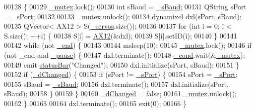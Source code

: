 \begin{DoxyCode}
00128 \{
00129     \hyperlink{a00008_a6327eafc0dac189ec1b202d63ef32457}{\_mutex}.lock();
00130     \textcolor{keywordtype}{int} sBaud = \hyperlink{a00008_a5b9a41b9e271275b914affb0a845a2ee}{\_sBaud};
00131     QString sPort = \hyperlink{a00008_ac9a614aa1518efb49b0a06636bd1bdbf}{\_sPort};
00132     
00133     \hyperlink{a00008_a6327eafc0dac189ec1b202d63ef32457}{\_mutex}.unlock();
00134     \hyperlink{a00004}{dynamixel} dxl(sPort, sBaud);
00135     QVector< AX12 > S(\hyperlink{a00008_a1ac6662fe6d198b5971ae0ffa7ddfcfd}{\_servos}.size());    
00136     
00137     \textcolor{keywordflow}{for} (\textcolor{keywordtype}{int} i = 0; i < S.size(); ++i) \{
00138         S[i] = \hyperlink{a00001}{AX12}(&dxl);  
00139         S[i].setID(i);
00140     \}
00141     
00142     \textcolor{keywordflow}{while} (not \hyperlink{a00008_acca9896d1a2d1ef68527e6834f81c76c}{\_end}) \{
00143         
00144         msleep(10);
00145         \hyperlink{a00008_a6327eafc0dac189ec1b202d63ef32457}{\_mutex}.lock();
00146         \textcolor{keywordflow}{if} (not \_end and \hyperlink{a00008_aaf2ef80e8e43518b75d20a5102970d2e}{\_pause}) \{
00147             dxl.terminate();
00148             \hyperlink{a00008_afcb93c09acd7fecf47d92996a297365c}{\_cond}.wait(&\hyperlink{a00008_a6327eafc0dac189ec1b202d63ef32457}{\_mutex});
00149             emit \hyperlink{a00008_a3c84cf179d1746091795c60f3a68ce06}{statusBar}(\textcolor{stringliteral}{"Changed"});
00150             dxl.initialize(sPort, sBaud);
00151         \}        
00152         \textcolor{keywordflow}{if} (\hyperlink{a00008_a2b6ccfeacbb3cc9ac5c34549b9aa3f11}{\_dChanged}) \{
00153             \textcolor{keywordflow}{if} (sPort != \hyperlink{a00008_ac9a614aa1518efb49b0a06636bd1bdbf}{\_sPort}) \{
00154                 sPort = \hyperlink{a00008_ac9a614aa1518efb49b0a06636bd1bdbf}{\_sPort};
00155                 sBaud = \hyperlink{a00008_a5b9a41b9e271275b914affb0a845a2ee}{\_sBaud};
00156                 dxl.terminate();
00157                 dxl.initialize(sPort, sBaud);
00158             \}   
00159         \}
00160         \hyperlink{a00008_a2b6ccfeacbb3cc9ac5c34549b9aa3f11}{\_dChanged} = \textcolor{keyword}{false};
00161         \hyperlink{a00008_a6327eafc0dac189ec1b202d63ef32457}{\_mutex}.unlock();
00162     \}
00163     
00164     dxl.terminate();
00165     exit(0);
00166 \}
\end{DoxyCode}
\hypertarget{a00008_ae17f4b27cae8b171f48fd55d2dc72dbd}{}
